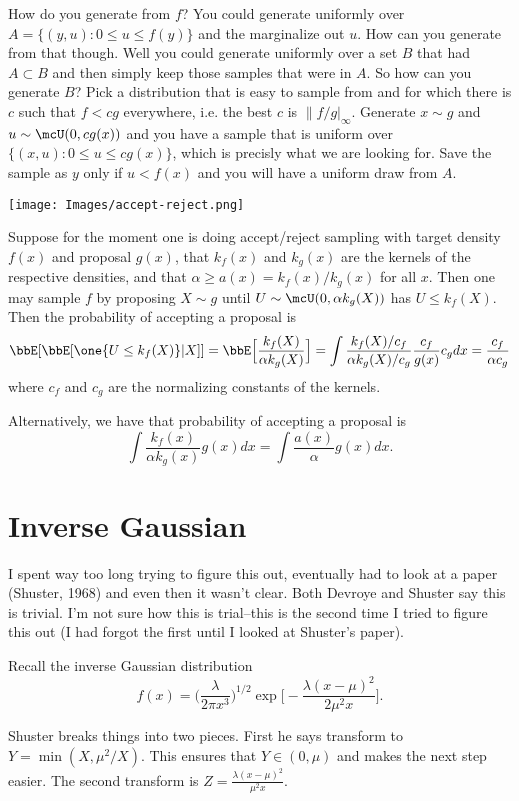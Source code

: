 \documentclass[]{article}
\begin{document}
How do you generate from $f$?  You could generate uniformly over $A = \{ (y,u) :
0 \leq u \leq f(y) \}$ and the marginalize out $u$.  How can you generate from
that though.  Well you could generate uniformly over a set $B$ that had $A
\subset B$ and then simply keep those samples that were in $A$.  So how can you
generate $B$?  Pick a distribution that is easy to sample from and for which
there is $c$ such that $f < cg$ everywhere, i.e. the best $c$ is
$\|f/g|_\infty$.  Generate $x \sim g$ and $u \sim \mcU(0, cg(x))$ and you have a
sample that is uniform over $\{(x,u) : 0 \leq u \leq cg(x) \}$, which is
precisly what we are looking for.  Save the sample as $y$ only if $u < f(x)$ and
you will have a uniform draw from $A$.

\texttt{[image: Images/accept-reject.png]}

Suppose for the moment one is doing accept/reject sampling with target density
$f(x)$ and proposal $g(x)$, that $k_f(x)$ and $k_g(x)$ are the kernels of the
respective densities, and that $\alpha \geq a(x) = k_f(x) / k_g(x)$ for all $x$.
Then one may sample $f$ by proposing $X \sim g$ until $U \sim \mcU(0, \alpha
k_g(X))$ has $U \leq k_f(X)$.  Then the probability of accepting a proposal is
\[
\bbE[ \bbE[\one \{U \leq k_f(X)\} | X] ] = \bbE \Big[ \frac{k_f(X)}{\alpha
  k_g(X)} \Big] = \int \frac{k_f(X) / c_f}{\alpha k_g(X)/c_g}
\frac{c_f}{g(x)}{c_g} dx = \frac{c_f}{\alpha c_g}
\]
where $c_f$ and $c_g$ are the normalizing constants of the kernels.

Alternatively, we have that probability of accepting a proposal is
\[
\int \frac{k_f(x)}{\alpha k_g(x)} g(x) dx = \int \frac{a(x)}{\alpha} g(x) dx.
\]

\section{Inverse Gaussian}

I spent way too long trying to figure this out, eventually had to look at a
paper (Shuster, 1968) and even then it wasn't clear.  Both Devroye and Shuster
say this is trivial.  I'm not sure how this is trial--this is the second time I
tried to figure this out (I had forgot the first until I looked at Shuster's
paper).

Recall the inverse Gaussian distribution
\[
f(x) = \Big( \frac{\lambda}{2 \pi x^3} \Big)^{1/2} 
\exp \Big[ - \frac{\lambda(x-\mu)^2}{2 \mu^2 x} \Big].
\]

Shuster breaks things into two pieces. First he says transform to $Y = \min(X,
\mu^2 / X)$.  This ensures that $Y \in (0, \mu)$ and makes the next step
easier.  The second transform is $Z = \frac{\lambda (x-\mu)^2}{\mu^2 x}$.
\end{document}
